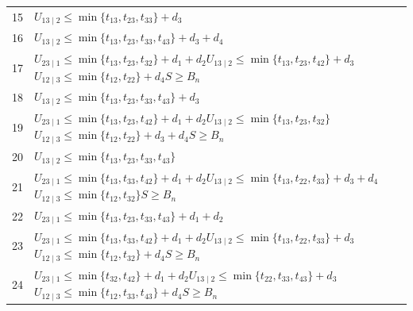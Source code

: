 \documentclass[a4paper,11pt]{amsart}
\numberwithin{equation}{section}
\theoremstyle{definition}
\theoremstyle{remark}
\begin{document}
{\begin{longtable}{@{}r>{\raggedright\arraybackslash}p{12.9cm}@{}}
15 & \(U_{13\mid 2}\leq \min\{t_{13},t_{23},t_{33}\}+d_{3}\)\\
16 & \(U_{13\mid 2}\leq \min\{t_{13},t_{23},t_{33},t_{43}\}+d_{3}+d_{4}\)\\
17 & \(U_{23\mid 1}\leq \min\{t_{13},t_{23},t_{32}\}+d_{1}+d_{2}\)\newline \(U_{13\mid 2}\leq \min\{t_{13},t_{23},t_{42}\}+d_{3}\)\newline \(U_{12\mid 3}\leq \min\{t_{12},t_{22}\}+d_{4}\)\newline \(S\geq B_n\)\\
18 & \(U_{13\mid 2}\leq \min\{t_{13},t_{23},t_{33},t_{43}\}+d_{3}\)\\
19 & \(U_{23\mid 1}\leq \min\{t_{13},t_{23},t_{42}\}+d_{1}+d_{2}\)\newline \(U_{13\mid 2}\leq \min\{t_{13},t_{23},t_{32}\}\)\newline \(U_{12\mid 3}\leq \min\{t_{12},t_{22}\}+d_{3}+d_{4}\)\newline \(S\geq B_n\)\\
20 & \(U_{13\mid 2}\leq \min\{t_{13},t_{23},t_{33},t_{43}\}\)\\
21 & \(U_{23\mid 1}\leq \min\{t_{13},t_{33},t_{42}\}+d_{1}+d_{2}\)\newline \(U_{13\mid 2}\leq \min\{t_{13},t_{22},t_{33}\}+d_{3}+d_{4}\)\newline \(U_{12\mid 3}\leq \min\{t_{12},t_{32}\}\)\newline \(S\geq B_n\)\\
22 & \(U_{23\mid 1}\leq \min\{t_{13},t_{23},t_{33},t_{43}\}+d_{1}+d_{2}\)\\
23 & \(U_{23\mid 1}\leq \min\{t_{13},t_{33},t_{42}\}+d_{1}+d_{2}\)\newline \(U_{13\mid 2}\leq \min\{t_{13},t_{22},t_{33}\}+d_{3}\)\newline \(U_{12\mid 3}\leq \min\{t_{12},t_{32}\}+d_{4}\)\newline \(S\geq B_n\)\\
24 & \(U_{23\mid 1}\leq \min\{t_{32},t_{42}\}+d_{1}+d_{2}\)\newline \(U_{13\mid 2}\leq \min\{t_{22},t_{33},t_{43}\}+d_{3}\)\newline \(U_{12\mid 3}\leq \min\{t_{12},t_{33},t_{43}\}+d_{4}\)\newline \(S\geq B_n\)\\
\end{longtable}
}

\clearpage
\end{document}

